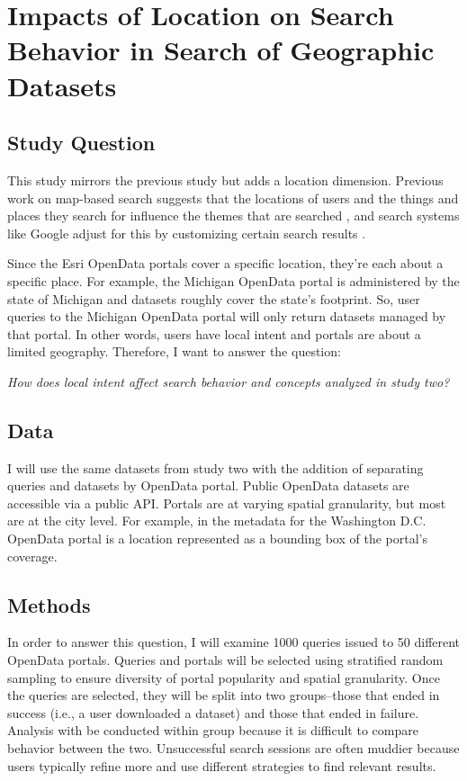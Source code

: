 \section{Impacts of Location on Search Behavior in Search of Geographic  Datasets}

\subsection{Study Question}
This study mirrors the previous study but adds a location dimension. Previous work on map-based search suggests that the locations of users and the things and places they search for influence the themes that are searched \cite{Xiao2010}, and search systems like Google adjust for this by customizing certain search results \cite{Kliman-Silver2015}.

Since the Esri OpenData portals cover a specific location, they're each about a specific place. For example, the Michigan OpenData portal is administered by the state of Michigan and datasets roughly cover the state's footprint. So, user queries to the Michigan OpenData portal will only return datasets managed by that portal. In other words, users have local intent and portals are about a limited geography. Therefore, I want to answer the question:
\linebreak

\emph{How does local intent affect search behavior and concepts analyzed in study two?}
\linebreak

\subsection{Data}
I will use the same datasets from study two with the addition of separating queries and datasets by OpenData portal. Public OpenData datasets are accessible via a public API. Portals are at varying spatial granularity, but most are at the city level. For example, in the metadata for the Washington D.C. OpenData portal is a location represented as a bounding box of the portal's coverage.


\subsection{Methods}
In order to answer this question, I will examine 1000 queries issued to 50 different OpenData portals. Queries and portals will be selected using stratified random sampling to ensure diversity of portal popularity and spatial granularity. Once the queries are selected, they will be split into two groups–those that ended in success (i.e., a user downloaded a dataset) and those that ended in failure. Analysis with be conducted within group because it is difficult to compare behavior between the two. Unsuccessful search sessions are often muddier because users typically refine more and use different strategies to find relevant results.

